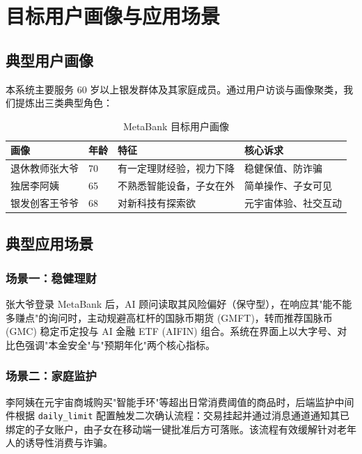 \documentclass[12pt,a4paper]{article}
\begin{document}
\section{目标用户画像与应用场景}

\subsection{典型用户画像}

本系统主要服务 60 岁以上银发群体及其家庭成员。通过用户访谈与画像聚类，我们提炼出三类典型角色：

\begin{table}[h]
\centering
\begin{tabular}{@{}llll@{}}
\toprule
\textbf{画像} & \textbf{年龄} & \textbf{特征} & \textbf{核心诉求} \\
\midrule
退休教师张大爷 & 70 & 有一定理财经验，视力下降 & 稳健保值、防诈骗 \\
独居李阿姨   & 65 & 不熟悉智能设备，子女在外 & 简单操作、子女可见 \\
银发创客王爷爷 & 68 & 对新科技有探索欲 & 元宇宙体验、社交互动 \\
\bottomrule
\end{tabular}
\caption{MetaBank 目标用户画像}
\end{table}

\subsection{典型应用场景}

\subsubsection{场景一：稳健理财}

张大爷登录 MetaBank 后，AI 顾问读取其风险偏好（保守型），在响应其"能不能多赚点"的询问时，主动规避高杠杆的国脉币期货 (GMFT)，转而推荐国脉币 (GMC) 稳定币定投与 AI 金融 ETF (AIFIN) 组合。系统在界面上以大字号、对比色强调"本金安全"与"预期年化"两个核心指标。

\subsubsection{场景二：家庭监护}

李阿姨在元宇宙商城购买"智能手环"等超出日常消费阈值的商品时，后端监护中间件根据 \texttt{daily\_limit} 配置触发二次确认流程：交易挂起并通过消息通道通知其已绑定的子女账户，由子女在移动端一键批准后方可落账。该流程有效缓解针对老年人的诱导性消费与诈骗。
\end{document}
